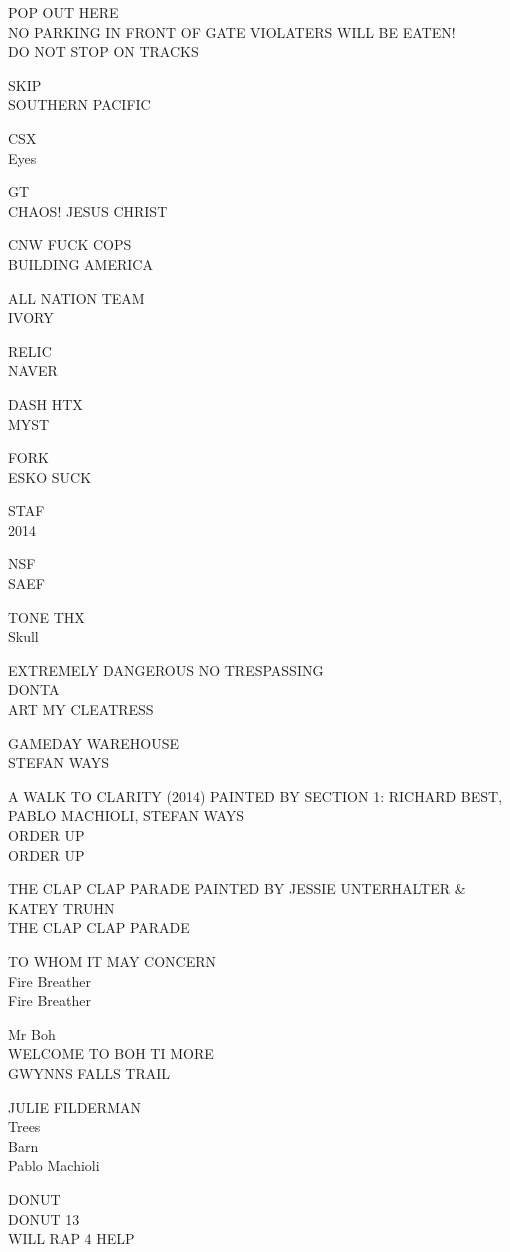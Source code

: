 \documentclass[10pt,letterpaper]{article}
\begin{document}
POP OUT HERE\\
NO PARKING IN FRONT OF GATE VIOLATERS WILL BE EATEN!\\
DO NOT STOP ON TRACKS

SKIP\\
SOUTHERN PACIFIC

CSX\\
Eyes

GT\\
CHAOS!  JESUS CHRIST

CNW FUCK COPS\\
BUILDING AMERICA

ALL NATION TEAM\\
IVORY

RELIC\\
NAVER

DASH HTX\\
MYST

FORK\\
ESKO SUCK

STAF\\
2014

NSF\\
SAEF

TONE THX\\
Skull

EXTREMELY DANGEROUS NO TRESPASSING\\
DONTA\\
ART MY CLEATRESS

GAMEDAY WAREHOUSE\\
STEFAN WAYS

A WALK TO CLARITY (2014) PAINTED BY SECTION 1: RICHARD BEST, PABLO MACHIOLI, STEFAN WAYS\\
ORDER UP\\
ORDER UP

THE CLAP CLAP PARADE PAINTED BY JESSIE UNTERHALTER \& KATEY TRUHN\\
THE CLAP CLAP PARADE

TO WHOM IT MAY CONCERN\\
Fire Breather\\
Fire Breather

Mr Boh\\
WELCOME TO BOH TI MORE\\
GWYNNS FALLS TRAIL

JULIE FILDERMAN\\
Trees\\
Barn\\
Pablo Machioli

DONUT\\
DONUT 13\\
WILL RAP 4 HELP
\end{document}
